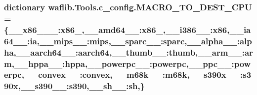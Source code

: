 \subsubsection[{\texorpdfstring{M\+A\+C\+R\+O\+\_\+\+T\+O\+\_\+\+D\+E\+S\+T\+\_\+\+C\+PU}{MACRO_TO_DEST_CPU}}]{\setlength{\rightskip}{0pt plus 5cm}dictionary waflib.\+Tools.\+c\+\_\+config.\+M\+A\+C\+R\+O\+\_\+\+T\+O\+\_\+\+D\+E\+S\+T\+\_\+\+C\+PU = \{\textquotesingle{}\+\_\+\+\_\+x86\+\_\+\_\+\+\_\+\textquotesingle{}\+:\textquotesingle{}x86\+\_\textquotesingle{},\textquotesingle{}\+\_\+\+\_\+amd64\+\_\+\+\_\+\textquotesingle{}\+:\textquotesingle{}x86\+\_\textquotesingle{},\textquotesingle{}\+\_\+\+\_\+i386\+\_\+\+\_\+\textquotesingle{}\+:\textquotesingle{}x86\textquotesingle{},\textquotesingle{}\+\_\+\+\_\+ia64\+\_\+\+\_\+\textquotesingle{}\+:\textquotesingle{}ia\textquotesingle{},\textquotesingle{}\+\_\+\+\_\+mips\+\_\+\+\_\+\textquotesingle{}\+:\textquotesingle{}mips\textquotesingle{},\textquotesingle{}\+\_\+\+\_\+sparc\+\_\+\+\_\+\textquotesingle{}\+:\textquotesingle{}sparc\textquotesingle{},\textquotesingle{}\+\_\+\+\_\+alpha\+\_\+\+\_\+\textquotesingle{}\+:\textquotesingle{}alpha\textquotesingle{},\textquotesingle{}\+\_\+\+\_\+aarch64\+\_\+\+\_\+\textquotesingle{}\+:\textquotesingle{}aarch64\textquotesingle{},\textquotesingle{}\+\_\+\+\_\+thumb\+\_\+\+\_\+\textquotesingle{}\+:\textquotesingle{}thumb\textquotesingle{},\textquotesingle{}\+\_\+\+\_\+arm\+\_\+\+\_\+\textquotesingle{}\+:\textquotesingle{}arm\textquotesingle{},\textquotesingle{}\+\_\+\+\_\+hppa\+\_\+\+\_\+\textquotesingle{}\+:\textquotesingle{}hppa\textquotesingle{},\textquotesingle{}\+\_\+\+\_\+powerpc\+\_\+\+\_\+\textquotesingle{}\+:\textquotesingle{}powerpc\textquotesingle{},\textquotesingle{}\+\_\+\+\_\+ppc\+\_\+\+\_\+\textquotesingle{}\+:\textquotesingle{}powerpc\textquotesingle{},\textquotesingle{}\+\_\+\+\_\+convex\+\_\+\+\_\+\textquotesingle{}\+:\textquotesingle{}convex\textquotesingle{},\textquotesingle{}\+\_\+\+\_\+m68k\+\_\+\+\_\+\textquotesingle{}\+:\textquotesingle{}m68k\textquotesingle{},\textquotesingle{}\+\_\+\+\_\+s390x\+\_\+\+\_\+\textquotesingle{}\+:\textquotesingle{}s390x\textquotesingle{},\textquotesingle{}\+\_\+\+\_\+s390\+\_\+\+\_\+\textquotesingle{}\+:\textquotesingle{}s390\textquotesingle{},\textquotesingle{}\+\_\+\+\_\+sh\+\_\+\+\_\+\textquotesingle{}\+:\textquotesingle{}sh\textquotesingle{},\}}\hypertarget{namespacewaflib_1_1_tools_1_1c__config_ae089c683e7e1d3184631f75b4e913291}{}\label{namespacewaflib_1_1_tools_1_1c__config_ae089c683e7e1d3184631f75b4e913291}


